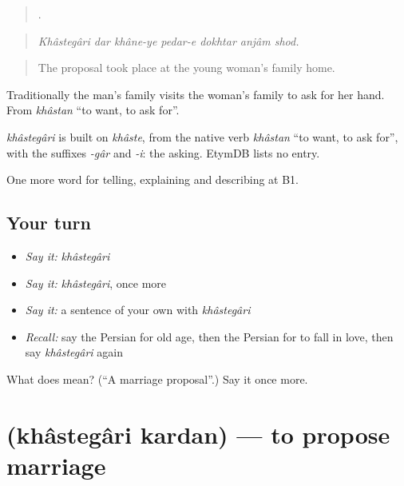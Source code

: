 \begin{quote}
      .
\end{quote}

\begin{quote}
\emph{Khâstegâri dar khâne-ye pedar-e dokhtar anjâm shod.}
\end{quote}

\begin{quote}
The proposal took place at the young woman's family home.
\end{quote}

Traditionally the man's family visits the woman's family to ask for her hand. From \emph{khâstan} \textquotedblleft{}to want, to ask for\textquotedblright{}.

\begin{cousinweb}
\emph{khâstegâri} is built on \emph{khâste}, from the native verb \emph{khâstan} \textquotedblleft{}to want, to ask for\textquotedblright{}, with the suffixes \emph{-gâr} and \emph{-i}: the asking. EtymDB lists no entry.
\end{cousinweb}

\begin{grammarlens}[title={What you've built}]
One more word for telling, explaining and describing at B1.
\end{grammarlens}

\subsection*{Your turn}
\begin{itemize}
\raggedright
  \item \emph{Say it:} \emph{khâstegâri}
  \item \emph{Say it:} \emph{khâstegâri}, once more
  \item \emph{Say it:} a sentence of your own with \emph{khâstegâri}
  \item \emph{Recall:} say the Persian for old age, then the Persian for to fall in love, then say \emph{khâstegâri} again
\end{itemize}

\begin{tcolorbox}[breakable,colback=teal!4,colframe=teal!35!black,title={Before you move on}]
What does  mean? (\textquotedblleft{}A marriage proposal\textquotedblright{}.) Say it once more.
\end{tcolorbox}
\section[\texorpdfstring{\fa{خواستگاری} \fa{کردن} (khâstegâri kardan)}{خواستگاری کردن (khâstegâri kardan)}]{  (khâstegâri kardan) — to propose marriage}

